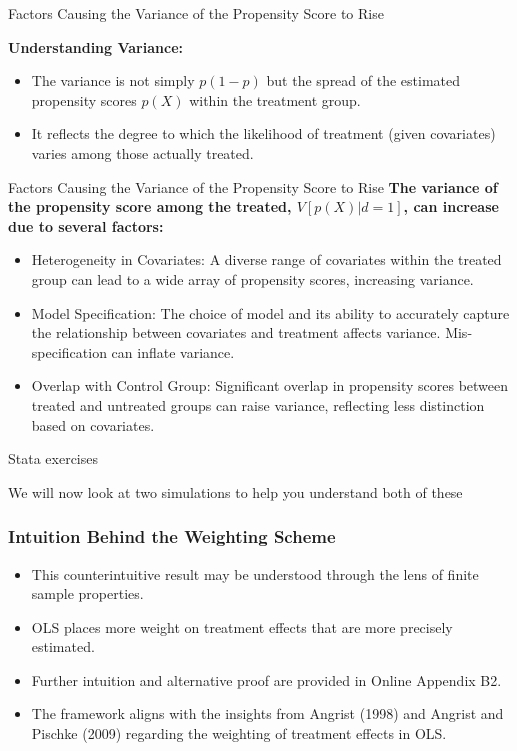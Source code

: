 \documentclass{beamer}
\begin{document}
\begin{frame}{Factors Causing the Variance of the Propensity Score to Rise}


\textbf{Understanding Variance:}
\begin{itemize}
  \item The variance is not simply \( p(1-p) \) but the spread of the estimated propensity scores \( p(X) \) within the treatment group.
  \item It reflects the degree to which the likelihood of treatment (given covariates) varies among those actually treated.
\end{itemize}
\end{frame}




\begin{frame}{Factors Causing the Variance of the Propensity Score to Rise}
\textbf{The variance of the propensity score among the treated, \( V[p(X) | d = 1] \), can increase due to several factors:}

\begin{itemize}
  \item \alert{Heterogeneity in Covariates:} A diverse range of covariates within the treated group can lead to a wide array of propensity scores, increasing variance.
  \item \alert{Model Specification:} The choice of model and its ability to accurately capture the relationship between covariates and treatment affects variance. Mis-specification can inflate variance.
  \item \alert{Overlap with Control Group:} Significant overlap in propensity scores between treated and untreated groups can raise variance, reflecting less distinction based on covariates.
\end{itemize}

\end{frame}


\begin{frame}{Stata exercises}

We will now look at two simulations to help you understand both of these

\end{frame}



\begin{frame}
\frametitle{Intuition Behind the Weighting Scheme}
\begin{itemize}
    \item This counterintuitive result may be understood through the lens of finite sample properties.
    \item OLS places more weight on treatment effects that are more precisely estimated.
    \item Further intuition and alternative proof are provided in Online Appendix B2.
    \item The framework aligns with the insights from Angrist (1998) and Angrist and Pischke (2009) regarding the weighting of treatment effects in OLS.
\end{itemize}
\end{frame}
\end{document}
